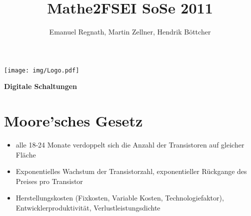 \documentclass[6pt,a4paper]{scrartcl}
\title{Mathe2FSEI SoSe 2011}
\author{Emanuel Regnath, Martin Zellner, Hendrik Böttcher}
\renewcommand{\emph}[1]{\textsf{\textbf{#1}}}
\begin{document}
\begin{multicols}{3}

\parbox{2.3cm}{
	\texttt{[image: img/Logo.pdf]}
}
\parbox{4cm}{
	\emph{\huge{Digitale Schaltungen}}
}

\section{Moore'sches Gesetz}
\begin{itemize} \itemsep0pt
	\item alle 18-24 Monate verdoppelt sich die Anzahl der Transistoren auf gleicher Fläche
	\item Exponentielles Wachstum der Transistorzahl, exponentieller Rückgange des Preises pro Transistor
	\item Herstellungskosten (Fixkosten, Variable Kosten, Technologiefaktor), Entwicklerproduktivität, Verlustleistungsdichte
\end{itemize}


\end{multicols}
\end{document}
